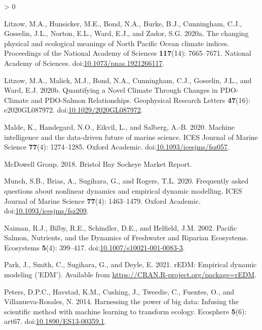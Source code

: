 \documentclass[
]{article}
\newlength{\cslhangindent}
\newenvironment{CSLReferences}[2] %
 {%
  \setlength{\parindent}{0pt}
  \ifodd #1 \everypar{\setlength{\hangindent}{\cslhangindent}}\ignorespaces\fi
  \ifnum #2 > 0
  \setlength{\parskip}{#2\baselineskip}
  \fi
 }%
 {}
\begin{document}
\begin{CSLReferences}{1}{0}
\leavevmode\hypertarget{ref-litzow2020a}{}%
Litzow, M.A., Hunsicker, M.E., Bond, N.A., Burke, B.J., Cunningham, C.J., Gosselin, J.L., Norton, E.L., Ward, E.J., and Zador, S.G. 2020a. The changing physical and ecological meanings of {North Pacific Ocean} climate indices. Proceedings of the National Academy of Sciences \textbf{117}(14): 7665--7671. {National Academy of Sciences}. doi:\href{https://doi.org/10.1073/pnas.1921266117}{10.1073/pnas.1921266117}.

\leavevmode\hypertarget{ref-litzow2020}{}%
Litzow, M.A., Malick, M.J., Bond, N.A., Cunningham, C.J., Gosselin, J.L., and Ward, E.J. 2020b. Quantifying a {Novel Climate Through Changes} in {PDO}-{Climate} and {PDO}-{Salmon Relationships}. Geophysical Research Letters \textbf{47}(16): e2020GL087972. doi:\href{https://doi.org/10.1029/2020GL087972}{10.1029/2020GL087972}.

\leavevmode\hypertarget{ref-malde2020}{}%
Malde, K., Handegard, N.O., Eikvil, L., and Salberg, A.-B. 2020. Machine intelligence and the data-driven future of marine science. ICES Journal of Marine Science \textbf{77}(4): 1274--1285. {Oxford Academic}. doi:\href{https://doi.org/10.1093/icesjms/fsz057}{10.1093/icesjms/fsz057}.

\leavevmode\hypertarget{ref-mcdowellgroup2018}{}%
McDowell Group. 2018. Bristol {Bay Sockeye Market Report}.

\leavevmode\hypertarget{ref-munch2020}{}%
Munch, S.B., Brias, A., Sugihara, G., and Rogers, T.L. 2020. Frequently asked questions about nonlinear dynamics and empirical dynamic modelling. ICES Journal of Marine Science \textbf{77}(4): 1463--1479. {Oxford Academic}. doi:\href{https://doi.org/10.1093/icesjms/fsz209}{10.1093/icesjms/fsz209}.

\leavevmode\hypertarget{ref-naiman2002}{}%
Naiman, R.J., Bilby, R.E., Schindler, D.E., and Helfield, J.M. 2002. Pacific {Salmon}, {Nutrients}, and the {Dynamics} of {Freshwater} and {Riparian Ecosystems}. Ecosystems \textbf{5}(4): 399--417. doi:\href{https://doi.org/10.1007/s10021-001-0083-3}{10.1007/s10021-001-0083-3}.

\leavevmode\hypertarget{ref-park2020}{}%
Park, J., Smith, C., Sugihara, G., and Deyle, E. 2021. rEDM: Empirical dynamic modeling ('EDM'). Available from \url{https://CRAN.R-project.org/package=rEDM}.

\leavevmode\hypertarget{ref-peters2014}{}%
Peters, D.P.C., Havstad, K.M., Cushing, J., Tweedie, C., Fuentes, O., and Villanueva-Rosales, N. 2014. Harnessing the power of big data: Infusing the scientific method with machine learning to transform ecology. Ecosphere \textbf{5}(6): art67. doi:\href{https://doi.org/10.1890/ES13-00359.1}{10.1890/ES13-00359.1}.


\end{CSLReferences}
\end{document}
